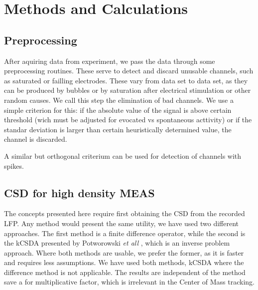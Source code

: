 \documentclass[12pt]{article}
\begin{document}
\section{Methods and Calculations}

\subsection{Preprocessing}

After aquiring data from experiment, we pass the data through some preprocessing
routines. These serve to detect and discard unusable channels,
such as saturated or failling electrodes. These vary from data set to data set,
as they can be produced by bubbles or by saturation after electrical stimulation
or other random causes. 
We call this step the elimination of bad channels. We use a simple criterion for this:
if the absolute value of the signal is above certain threshold (wich must be
adjusted for evocated vs spontaneous acttivity) or if the standar deviation is
larger than certain heuristically determined value, the channel is discarded.

A similar but orthogonal criterium can be used for detection of channels with
spikes. 




\subsection{CSD for high density MEAS}

The concepts presented here require first obtaining the CSD from the recorded LFP. Any method would present the same utility, we have used two different
approaches. The first method is a  finite difference operator, while the second is the kCSDA presented by Potworowski \emph{et all} \cite{Potworowski2011}, which is an inverse problem approach.  Where both methods are usable, we prefer the former,
as it is faster and requires less assumptions.
We have used both methods, kCSDA where
the difference method is not applicable. The results are
independent of the method save a for multiplicative factor, which
is irrelevant in the Center of Mass tracking. 
\end{document}
